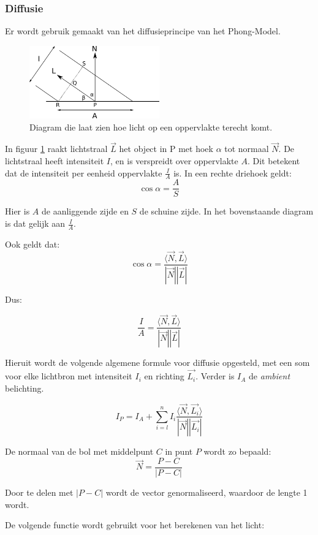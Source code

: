 \documentclass[12pt, a4paper]{article}
\begin{document}
\subsubsection{Diffusie}
Er wordt gebruik gemaakt van het diffusieprincipe van het Phong-Model. 

\begin{figure}[H]
    \centering
    \includegraphics[width=0.50\textwidth]{diffuse-diagram.png}
    \caption{Diagram die laat zien hoe licht op een oppervlakte terecht komt.}
    \label{fig:diffuse-diagram}
\end{figure}


In figuur \ref{fig:diffuse-diagram} raakt lichtstraal $\vec{L}$ het object in P met hoek $\alpha$ tot normaal $\vec{N}$. De lichtstraal heeft intensiteit $I$, en is verspreidt over oppervlakte $A$. Dit betekent dat de intensiteit per eenheid oppervlakte $\frac{I}{A}$ is. In een rechte driehoek geldt: 
\[\cos{\alpha}=\frac{A}{S}\]

Hier is $A$ de aanliggende zijde en $S$ de schuine zijde. In het bovenstaande diagram is dat gelijk aan $\frac{I}{A}$.

Ook geldt dat:
\[\cos \alpha = \frac{\langle \vec{N},\vec{L}\rangle}{|\vec{N}||\vec{L}|}\]

Dus: 

\[\frac{I}{A} = \frac{\langle \vec{N},\vec{L}\rangle}{|\vec{N}||\vec{L}|}\]

Hieruit wordt de volgende algemene formule voor diffusie opgesteld, met een som voor elke lichtbron met intensiteit $I_i$ en richting $\vec{L_i}$. Verder is $I_A$ de \textit{ambient} belichting.

\[I_P=I_A+\sum_{i=l}^{n}I_i\frac{\langle \vec{N}, \vec{L_i} \rangle}{|\vec{N}||\vec{L_i}|}\]

De normaal van de bol met middelpunt $C$ in punt $P$ wordt zo bepaald:
\[\vec{N}=\frac{P-C}{|P-C|}\]

Door te delen met $|P-C|$ wordt de vector genormaliseerd, waardoor de lengte 1 wordt.

De volgende functie wordt gebruikt voor het berekenen van het licht:
\end{document}
